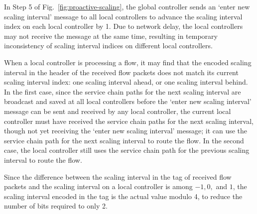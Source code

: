 

In Step 5 of Fig.~\ref{fig:proactive-scaling}, the global controller sends an `enter new scaling interval' message to all local controllers to advance the scaling interval index on each local controller by 1. Due to network delay, the local controllers may not receive the message at the same time, resulting in temporary inconsistency of scaling interval indices on different local controllers.

When a local controller %
is processing a flow, it may find that the encoded scaling interval in the header of the received flow packets does not match its current scaling interval index: one scaling interval ahead, or one scaling interval behind. In the first case, since the service chain paths for the next scaling interval are broadcast and saved at all local controllers before the `enter new scaling interval' message can be sent and received by any local controller, the current local controller must have received the service chain paths for the next scaling interval, though not yet receiving the `enter new scaling interval' message; it can use the service chain path for the next scaling interval to route the flow. In the second case, %
the local controller still uses the service chain path for the previous scaling interval to route the flow.

Since the difference between the scaling interval in the tag of received flow packets and the scaling interval on a local controller is among $-1, 0,$ and $1$, the scaling interval encoded in the tag is the actual value modulo 4, to reduce the number of bits required to only 2.



